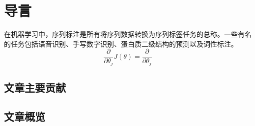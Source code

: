 \chapter{导言}
在机器学习中，序列标注是所有将序列数据转换为序列标签任务的总称。一些有名的任务包括语音识别、手写数字识别、蛋白质二级结构的预测以及词性标注。
\begin{equation}
\frac{\partial}{\partial \theta_j} J (\theta) = \frac{\partial}{\partial \theta_j}
\end{equation}
\section{文章主要贡献}
\section{文章概览}
